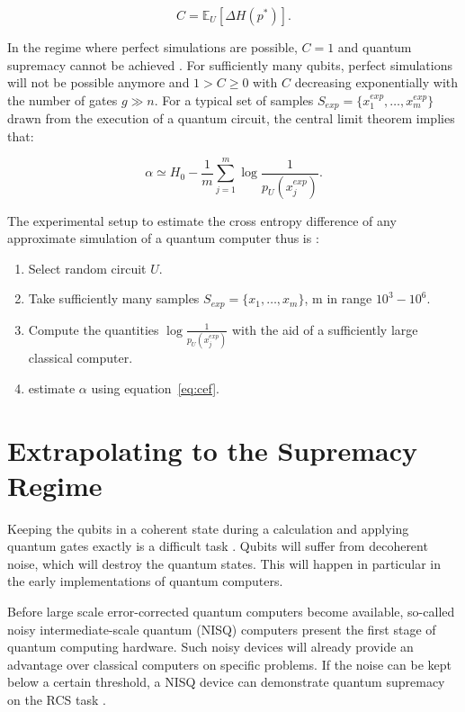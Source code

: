 \begin{equation}
  C = \mathbb{E}_U[\Delta H(p^*)] .
\end{equation}

In the regime where perfect simulations are possible, $C=1$ and quantum
supremacy cannot be achieved \cite{Boixo2018supremacy}. For sufficiently many qubits, perfect simulations
will not be possible anymore and $1 > C \geq 0$ with $C$ decreasing exponentially
with the number of gates $g\gg n$. For a typical set of samples $S_{exp} = \{x_1^{exp}, \dots , x_m^{exp}\}$ drawn from the
execution of a quantum circuit, the central limit theorem implies that:

\begin{equation}
  \label{eq:cef}
  \alpha \simeq H_0 - \frac{1}{m} \sum_{j = 1}^m \log{\frac{1}{p_U(x_j^{exp})}}.
\end{equation}

The experimental setup to estimate the cross entropy difference of any
approximate simulation of a quantum computer thus is \cite{Boixo2018supremacy}:

\begin{enumerate}
\item Select random circuit $U$.
  \item Take sufficiently many samples $S_{exp} = \{x_1, \dots, x_m\}$, m in
    range $10^3-10^6$.
    \item Compute the quantities $\log{\frac{1}{p_U(x_j^{exp})}}$ with the aid
      of a sufficiently large classical computer.
      \item estimate $\alpha$ using equation~\ref{eq:cef}.
\end{enumerate}

\section{Extrapolating to the Supremacy Regime}
\label{sec:supremacy_regime}

Keeping the qubits in a coherent state during a calculation and applying quantum
gates exactly is a difficult task \cite{martines2019supremacy}. Qubits will suffer from decoherent noise, which will destroy the quantum states. This will happen in particular in the early implementations of quantum computers.

Before large scale error-corrected quantum computers become available, so-called noisy intermediate-scale quantum (NISQ) computers present the first stage
of quantum computing hardware. Such noisy devices will already provide an
advantage over classical computers on specific problems. If the noise can be
kept below a certain threshold, a NISQ device can demonstrate quantum
supremacy on the RCS task \cite{neill2018blueprint}.

